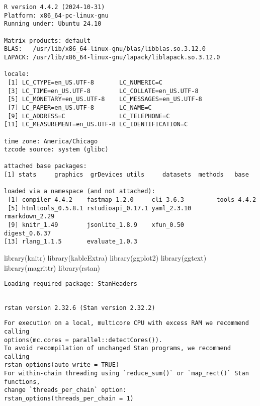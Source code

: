 \documentclass[
  12,
  letterpaper,
  DIV=11,
  numbers=noendperiod]{scrartcl}
\newenvironment{Shaded}{\begin{snugshade}}{\end{snugshade}}
\newcommand{\FunctionTok}[1]{\textcolor[rgb]{0.28,0.35,0.67}{#1}}
\newcommand{\NormalTok}[1]{\textcolor[rgb]{0.00,0.23,0.31}{#1}}
\begin{document}
\begin{verbatim}
R version 4.4.2 (2024-10-31)
Platform: x86_64-pc-linux-gnu
Running under: Ubuntu 24.10

Matrix products: default
BLAS:   /usr/lib/x86_64-linux-gnu/blas/libblas.so.3.12.0 
LAPACK: /usr/lib/x86_64-linux-gnu/lapack/liblapack.so.3.12.0

locale:
 [1] LC_CTYPE=en_US.UTF-8       LC_NUMERIC=C              
 [3] LC_TIME=en_US.UTF-8        LC_COLLATE=en_US.UTF-8    
 [5] LC_MONETARY=en_US.UTF-8    LC_MESSAGES=en_US.UTF-8   
 [7] LC_PAPER=en_US.UTF-8       LC_NAME=C                 
 [9] LC_ADDRESS=C               LC_TELEPHONE=C            
[11] LC_MEASUREMENT=en_US.UTF-8 LC_IDENTIFICATION=C       

time zone: America/Chicago
tzcode source: system (glibc)

attached base packages:
[1] stats     graphics  grDevices utils     datasets  methods   base     

loaded via a namespace (and not attached):
 [1] compiler_4.4.2    fastmap_1.2.0     cli_3.6.3         tools_4.4.2      
 [5] htmltools_0.5.8.1 rstudioapi_0.17.1 yaml_2.3.10       rmarkdown_2.29   
 [9] knitr_1.49        jsonlite_1.8.9    xfun_0.50         digest_0.6.37    
[13] rlang_1.1.5       evaluate_1.0.3   
\end{verbatim}

\begin{Shaded}
\begin{Highlighting}[numbers=left,,]
\FunctionTok{library}\NormalTok{(knitr)}
\FunctionTok{library}\NormalTok{(kableExtra)}
\FunctionTok{library}\NormalTok{(ggplot2)}
\FunctionTok{library}\NormalTok{(ggtext)}
\FunctionTok{library}\NormalTok{(magrittr)}
\FunctionTok{library}\NormalTok{(rstan)}
\end{Highlighting}
\end{Shaded}

\begin{verbatim}
Loading required package: StanHeaders
\end{verbatim}

\begin{verbatim}

rstan version 2.32.6 (Stan version 2.32.2)
\end{verbatim}

\begin{verbatim}
For execution on a local, multicore CPU with excess RAM we recommend calling
options(mc.cores = parallel::detectCores()).
To avoid recompilation of unchanged Stan programs, we recommend calling
rstan_options(auto_write = TRUE)
For within-chain threading using `reduce_sum()` or `map_rect()` Stan functions,
change `threads_per_chain` option:
rstan_options(threads_per_chain = 1)
\end{verbatim}
\end{document}
